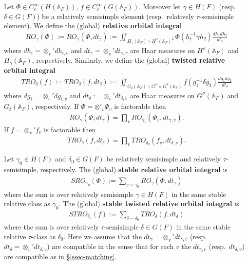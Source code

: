 \documentclass[12pt]{amsart}
\theoremstyle{remark}
\numberwithin{equation}{section}
\newcommand{\A}{\mathbb{A}}
\theoremstyle{definition}
\numberwithin{equation}{subsection}
\begin{document}
Let $\Phi \in C^{\infty}_c(H(\A_F))$, $f \in C^{\infty}_c(G(\A_F))$.  Moreover let $\gamma \in
H(F)$ (resp. $\delta \in G(F)$) be a relatively semisimple element (resp.~relatively $\tau$-semisimple element).  We define the (global) \textbf{relative orbital integral}
\begin{align} \label{goi}
RO_{\gamma}(\Phi):=RO_{\gamma}(\Phi,dt_{\gamma}):=
\iint_{H_{\gamma}(\A_F) \backslash
H^{\sigma}(\A_F)^2}\Phi(h_1^{-1}\gamma h_2)
\frac{dh_1dh_2}{dt_{\gamma}}
\end{align}where $dh_i=\otimes_v'dh_{i,v}$ and $dt_{\gamma}=\otimes_v' dt_{\gamma,v}$ are Haar measures on
$H^{\sigma}(\A_F)$ and $H_{\gamma}(\A_F)$, respectively.  Similarly, we define the (global) \textbf{twisted relative orbital integral}
\begin{align} \label{gtoi}
TRO_{\delta}(f):=TRO_{\delta}(f,dt_{\delta}):=
\iint_{G_{\delta}(\A_F) \backslash G^{\sigma}\times G^{\theta}(\A_F)}
f(g_1^{-1} \delta g_2)\frac{dg_1dg_2}{dt_{\delta}}
\end{align}where $dg_i=\otimes_v'dg_{i,v}$ and $dt_{\delta}:=\otimes_v'dt_{\delta,v}$ are Haar measures on $G^{\sigma}(\A_F)$ and $G_{\delta}(\A_F)$, respectively.
If
$\Phi=\otimes'_v\Phi_v$ is factorable then
\begin{align}
RO_{\gamma}(\Phi,dt_{\gamma})=\prod_v RO_{\gamma_v}(\Phi_v,dt_{\gamma,v}).
\end{align}
If  $f=\otimes_v' f_v$ is factorable then
\begin{align}
TRO_{\delta}(f,dt_{\delta})=\prod_vTRO_{\delta_v}
(f_v,dt_{\delta,v}).
\end{align}

Let $\gamma_0 \in H(F)$ and $\delta_0 \in G(F)$ be relatively semisimple and relatively $\tau$-semisimple, respectively.  The
(global) \textbf{stable relative orbital integral} is
\begin{align} \label{gsoi}
SRO_{\gamma_0}(\Phi):=\sum_{\gamma \sim \gamma_0}
RO_{\gamma}(\Phi,dt_{\gamma})
\end{align} where the sum is over relatively semisimple $\gamma \in H(F)$ in the same stable relative class as $\gamma_0$.
The (global) \textbf{stable twisted relative orbital integral} is
\begin{align}
STRO_{\delta_0}(f):=
\sum_{\delta \sim \delta_0}TRO_{\delta}(f,dt_{\delta})
\end{align} where the sum is over relatively $\tau$-semisimple $\delta \in G(F)$ in the same stable relative $\tau$-class as $\delta_0$.
Here we assume that the
$dt_{\gamma}=\otimes_v'dt_{\gamma,v}$ (resp.~$dt_{\delta}=\otimes_v'dt_{\delta,v}$) are compatible in the sense that for each
$v$ the $dt_{\gamma,v}$ (resp.~$dt_{\delta,v}$) are compatible as in \S \ref{ssec-matching}.
\end{document}
